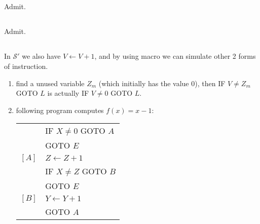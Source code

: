 \subsection{}
Admit.

\subsection{}
Admit.


\subsection{}
In $\mathscr{S}'$ we also have $ V \gets V + 1$, and by using macro we can 
simulate other 2 forms of instruction.
\begin{enumerate}
\item 
find a unused variable $ Z_{m} $ (which initially has the value 0),
then IF $ V \neq Z_{m} $ GOTO $L$ is actually IF $ V \neq 0 $ GOTO $L$.

\item 
following program computes $ f(x) = x - 1 $:
\begin{center}
\begin{tabular}{ll}
        & IF $ X \neq 0 $ GOTO $A$ \\
        & GOTO $E$ \\
  $[A]$ & $ Z \gets Z + 1 $ \\
        & IF $ X \neq Z $ GOTO $B$ \\
        & GOTO $E$ \\
  $[B]$ & $ Y \gets Y + 1 $ \\
        & GOTO $A$ \\
\end{tabular}
\end{center}

\end{enumerate}
